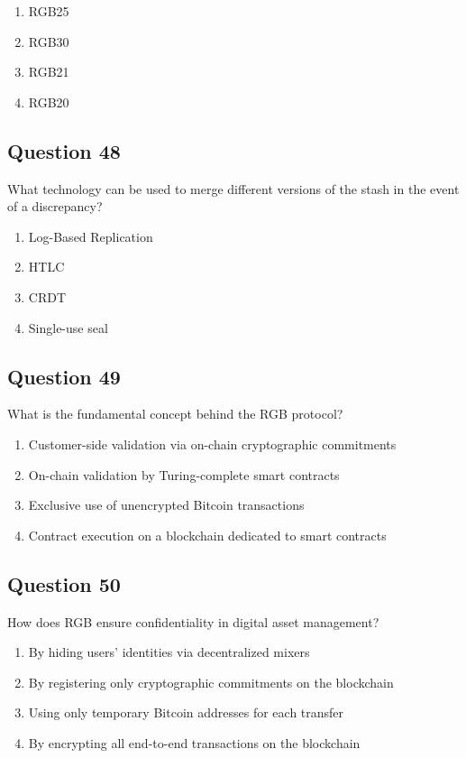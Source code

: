 \documentclass[12pt,a4paper]{article}
\begin{document}
\begin{enumerate}[label=\Alph*., leftmargin=*]
\item RGB25
\item RGB30
\item RGB21
\item RGB20
\end{enumerate}

\bigskip


\subsection*{Question 48}
What technology can be used to merge different versions of the stash in the event of a discrepancy?

\begin{enumerate}[label=\Alph*., leftmargin=*]
\item Log-Based Replication
\item HTLC
\item CRDT
\item Single-use seal
\end{enumerate}

\bigskip


\subsection*{Question 49}
What is the fundamental concept behind the RGB protocol?

\begin{enumerate}[label=\Alph*., leftmargin=*]
\item Customer-side validation via on-chain cryptographic commitments
\item On-chain validation by Turing-complete smart contracts
\item Exclusive use of unencrypted Bitcoin transactions
\item Contract execution on a blockchain dedicated to smart contracts
\end{enumerate}

\bigskip


\subsection*{Question 50}
How does RGB ensure confidentiality in digital asset management?

\begin{enumerate}[label=\Alph*., leftmargin=*]
\item By hiding users' identities via decentralized mixers
\item By registering only cryptographic commitments on the blockchain
\item Using only temporary Bitcoin addresses for each transfer
\item By encrypting all end-to-end transactions on the blockchain
\end{enumerate}
\end{document}

